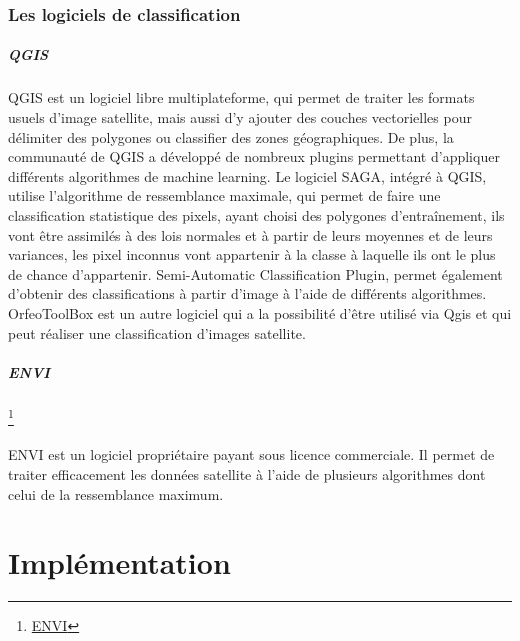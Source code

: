 \documentclass[a4paper,10pt]{report}
\begin{document}
\begin{multicols}{2}
\subsection{Les logiciels de classification}
\paragraph{QGIS}
\paragraph{}
QGIS est un logiciel libre multiplateforme, qui permet de traiter les formats usuels d'image satellite, mais aussi d'y ajouter des couches vectorielles pour délimiter des polygones ou classifier des zones géographiques.
De plus, la communauté de QGIS a développé de nombreux plugins permettant d'appliquer différents algorithmes de machine learning.\newline
Le logiciel SAGA, intégré à QGIS, utilise l'algorithme de ressemblance maximale, qui permet de faire une classification statistique des pixels, ayant choisi des polygones d’entraînement, ils vont être assimilés à des lois normales et à partir de leurs moyennes et de leurs variances, les pixel inconnus vont appartenir à la classe à laquelle ils ont le plus de chance d'appartenir.
Semi-Automatic Classification Plugin, permet également d'obtenir des classifications à partir d'image à l'aide de différents algorithmes.
OrfeoToolBox est un autre logiciel qui a la possibilité d'être utilisé via Qgis et qui peut réaliser une classification d'images satellite.

\paragraph{ENVI}\footnote{\href{http://www.exelisvis.fr/ProduitsetServices/LesproduitsENVI/ENVI.aspx}{ENVI}}
\paragraph{}
ENVI est un logiciel propriétaire payant sous licence commerciale. Il permet de traiter efficacement les données satellite à l'aide de plusieurs algorithmes dont celui de la ressemblance maximum.
\paragraph{}

\chapter{Implémentation}

\end{multicols}
\end{document}
